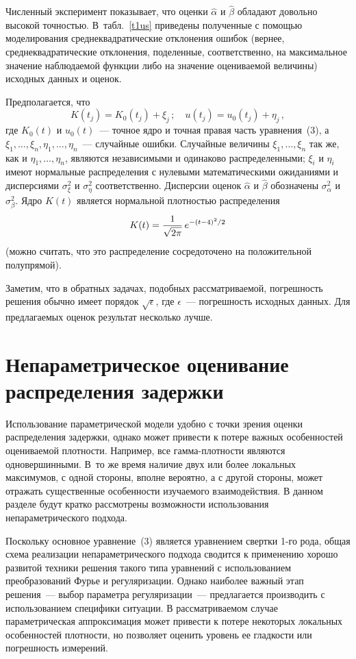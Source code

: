 \begin{multicols}{2}
Численный эксперимент показывает, что оценки $\hat\alpha$ и
$\hat\beta$ обладают довольно высокой точностью. В~табл.~\ref{t1us}
приведены полученные с помощью моделирования среднеквадратические
отклонения ошибок (вернее, среднеквадратические отклонения,
поделенные, соответственно, на максимальное значение наблюдаемой
функции либо на значение оцениваемой величины) исходных данных и
оценок.


Предполагается, что 
\begin{equation*} %
K(t_j)=K_0(t_j)+\xi_j\,;\quad
u(t_j)=u_0(t_j)+\eta_j\,,
\end{equation*} %
где $K_0(t)$ и $u_0(t)$~--- точное ядро
и точная правая часть уравнения~(3), а $\xi_1, \ldots , \xi_n, \eta_1,
\ldots , \eta_n$~--- случайные ошибки. Случайные величины $\xi_1, \ldots ,
\xi_n$ так же, как и $\eta_1, \ldots , \eta_n$, являются независимыми
и одинаково распределенными; $\xi_i$ и $\eta_i$ имеют нормальные
распределения с нулевыми математическими ожиданиями и дисперсиями
$\sigma_\xi^2$ и $\sigma_\eta^2$ соответственно. Дисперсии оценок
$\hat\alpha$ и $\hat\beta$ обозначены $\sigma_\alpha^2$ и
$\sigma_\beta^2$. Ядро $K(t)$ является нормальной плотностью
распределения
$$
K(t)=\displaystyle\frac{\displaystyle 1\mathstrut}{\displaystyle \sqrt{2\pi}\mathstrut}\,e^{-(t-4)^2/2}$$ (можно
считать, что это распределение сосредоточено на положительной
полупрямой).

Заметим, что в обратных задачах, подобных рассматриваемой, погрешность решения
обычно имеет порядок
$\sqrt\epsilon$, где
$\epsilon$~--- погрешность исходных данных. Для предлагаемых оценок результат
несколько лучше.

           
\section{Непараметрическое оценивание распределения задержки}

Использование параметрической модели удобно с точки зрения оценки
распределения задержки, однако может привести к потере важных
особенностей оцениваемой плотности. Например, все гамма-плот\-ности
являются одновершинными. В~то же время наличие двух или более
локальных максимумов, с одной стороны, вполне вероятно, а с другой
стороны, может отражать существенные особенности изучаемого
взаимодействия. В данном разделе будут кратко рассмотрены
возможности использования непараметрического подхода.

Поскольку основное уравнение~(3) является уравнением свертки 1-го рода, общая схема
реализации непараметрического подхода сводится к применению хорошо развитой техники
решения такого типа уравнений с использованием преобразований Фурье и регуляризации.
Однако наиболее важный этап решения~--- выбор параметра регуляризации~--- предлагается
производить с использованием специфики ситуации. В рас\-смат\-ри\-ва\-емом случае
параметрическая аппроксимация может привести к потере некоторых локальных
особенностей плотности, но позволяет оценить уровень ее гладкости или
погрешность измерений.


\end{multicols}
